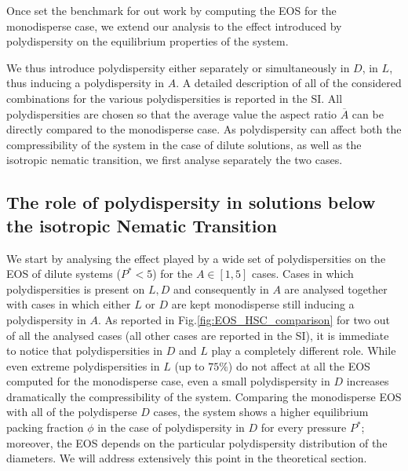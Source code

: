 \documentclass[journal=jacsat,manuscript=article]{achemso}
\begin{document}
Once set the benchmark for out work by computing the EOS for the monodisperse case, we extend our analysis to the effect introduced by  polydispersity on the equilibrium properties of the system. 

We thus introduce polydispersity either separately or simultaneously in $D$, in $L$, thus inducing a polydispersity in $A$. A detailed description of all of the considered combinations for the various polydispersities is reported in the SI. 
All polydispersities are chosen so that the average value the aspect ratio $\overline{A}$ can be directly compared to the monodisperse case. 
As polydispersity can affect both the compressibility of the system in the case of dilute solutions, as well as the isotropic nematic transition, we first analyse separately the two cases.

\subsection{The role of polydispersity in  solutions below the isotropic Nematic Transition}
We start by analysing the effect played by a wide set of polydispersities on the EOS of dilute systems ($P^*<5$) for the $A\in [1,5]$ cases. Cases in which polydispersities is present on $L, D$ and consequently in $A$ are analysed together with cases in which either $L$ or $D$ are kept monodisperse still inducing a polydispersity in  $A$. 
As reported in Fig.\ref{fig:EOS_HSC_comparison} for two out of all the analysed cases (all other cases are reported in the SI), it is immediate to notice that polydispersities in $D$ and $L$ play a completely different role. While  even extreme polydispersities in $L$ (up to $75\%$)  do not affect at all the EOS computed for the monodisperse case, even a small polydispersity in $D$ increases dramatically the compressibility of the system.
Comparing the monodisperse EOS with all of the polydisperse $D$ cases, the system shows  a higher equilibrium packing fraction $\phi$ in the case of polydispersity in $D$ for every  pressure $P^*$; moreover, the EOS depends on the particular polydispersity distribution of the diameters. We will address extensively  this point in the theoretical section.
\end{document}
